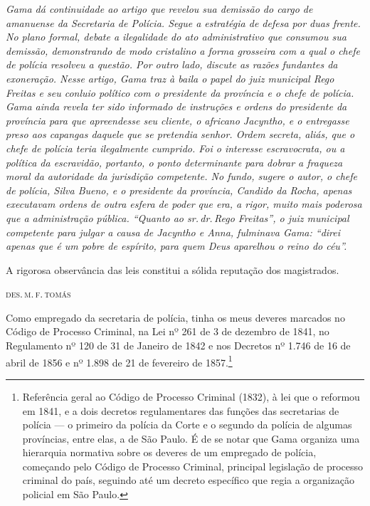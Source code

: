 \begin{flushleft}
{\footnotesize\itshape
Gama dá continuidade ao artigo que revelou sua demissão do cargo
de amanuense da Secretaria de Polícia. Segue a estratégia de defesa por
duas frente. No plano formal, debate a ilegalidade do ato administrativo
que consumou sua demissão, demonstrando de modo cristalino a forma
grosseira com a qual o chefe de polícia resolveu a questão. Por outro
lado, discute as razões fundantes da exoneração. Nesse artigo, Gama traz
à baila o papel do juiz municipal Rego Freitas e seu conluio político
com o presidente da província e o chefe de
polícia. Gama ainda revela ter sido informado de instruções e ordens do
presidente da província para que apreendesse seu cliente, o africano
Jacyntho, e o entregasse preso aos capangas daquele que se pretendia
senhor. Ordem secreta, aliás, que o chefe de polícia teria ilegalmente
cumprido. Foi o interesse escravocrata, ou a política da escravidão,
portanto, o ponto determinante para dobrar a fraqueza
moral da autoridade da
jurisdição competente. No fundo, sugere o autor, o chefe de polícia,
Silva Bueno, e o presidente da província, Candido da Rocha, apenas
executavam ordens de outra esfera de poder que era, a rigor, muito mais
poderosa que a administração pública. ``Quanto ao sr.\,dr.\,Rego Freitas'',
o juiz municipal competente para julgar a causa de Jacyntho e Anna,
fulminava Gama: ``direi apenas que é um pobre de espírito, para quem Deus
aparelhou o reino do céu''. }
\end{flushleft}

\pagebreak

\epigraph{A rigorosa observância das leis constitui a sólida reputação dos
magistrados.}{\textsc{des.\,m.\,f.\,tomás}\footnotemark}

\noindent{}Como empregado da secretaria de polícia, tinha os meus deveres marcados
no Código de Processo Criminal, na Lei nº 261 de 3 de dezembro de 1841,
no Regulamento nº 120 de 31 de Janeiro de 1842 e nos Decretos nº 1.746
de 16 de abril de 1856 e nº 1.898 de 21 de fevereiro de 1857.\footnote{
  Referência geral ao Código de Processo Criminal (1832), à lei que o
  reformou em 1841, e a dois decretos regulamentares das funções das
  secretarias de polícia --- o primeiro da polícia da Corte e o segundo da
  polícia de algumas províncias, entre elas, a de São Paulo. É de se
  notar que Gama organiza uma hierarquia normativa sobre os deveres de
  um empregado de polícia, começando pelo Código de Processo Criminal,
  principal legislação de processo criminal do país, seguindo até um
  decreto específico que regia a organização policial em São Paulo.}

